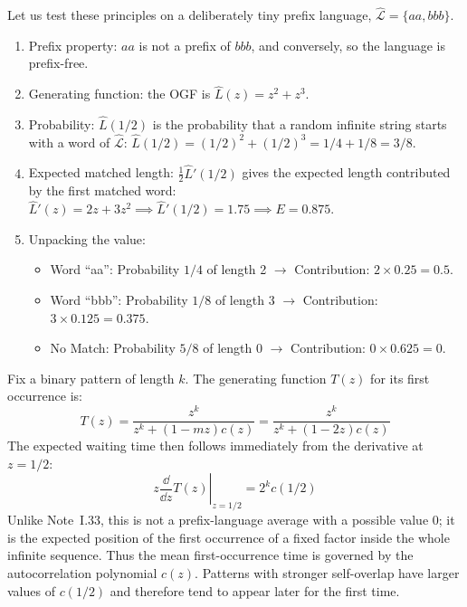 Let us test these principles on a deliberately tiny prefix language,
$\hat{\mathcal{L}} = \{aa, bbb\}$.
\begin{enumerate}
    \item Prefix property: $aa$ is not a prefix of $bbb$, and conversely, so the language is prefix-free.
    \item Generating function: the OGF is
        $\hat{L}(z) = z^{2} + z^{3}$.
    \item Probability: $\hat{L}(1/2)$ is the probability that a random infinite string starts with a word of $\hat{\mathcal{L}}$:
        $\hat{L}(1/2) = (1/2)^{2} + (1/2)^{3} = 1/4 + 1/8 = 3/8$.
    \item Expected matched length: $\frac{1}{2} \hat{L}'(1/2)$ gives the expected length contributed by the first matched word:
        $\hat{L}'(z) = 2z + 3z^{2} \implies \hat{L}'(1/2) = 1.75 \implies E = 0.875$.
    \item Unpacking the value:
        \begin{itemize}
            \item Word ``aa'': Probability $1/4$ of length 2 $\rightarrow$ Contribution: $2 \times 0.25 = 0.5$.
            \item Word ``bbb'': Probability $1/8$ of length 3 $\rightarrow$ Contribution: $3 \times 0.125 = 0.375$.
            \item No Match: Probability $5/8$ of length 0 $\rightarrow$ Contribution: $0 \times 0.625 = 0$.
        \end{itemize}
\end{enumerate}


Fix a binary pattern of length $k$. The generating function $T(z)$ for its first occurrence is:
\begin{equation*}
    T(z) = \frac{z^{k}}{z^{k} + (1 - mz)c(z)} = \frac{z^{k}}{z^{k} + (1 - 2z)c(z)}
\end{equation*}
The expected waiting time then follows immediately from the derivative at $z = 1/2$:
\begin{equation*}
    \left.z \frac{\dd}{\dd z} T(z)\right|_{z = 1/2} = 2^{k} c(1/2)
\end{equation*}
Unlike Note~I.33, this is not a prefix-language average with a possible value $0$; it is the
expected position of the first occurrence of a fixed factor inside the whole infinite sequence.
Thus the mean first-occurrence time is governed by the autocorrelation polynomial $c(z)$.
Patterns with stronger self-overlap have larger values of $c(1/2)$ and therefore tend to appear
later for the first time.

